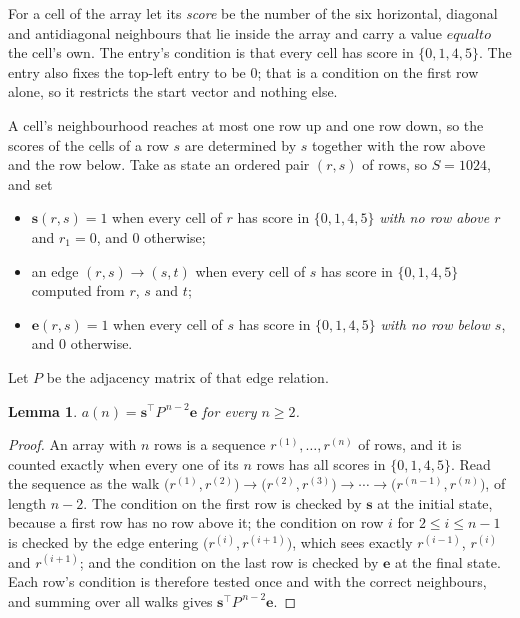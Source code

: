\documentclass[11pt,a4paper]{article}
\theoremstyle{plain}
\newtheorem{lemma}[theorem]{Lemma}
\theoremstyle{definition}
\begin{document}
For a cell of the array let its \emph{score} be the number of the six horizontal, diagonal and antidiagonal neighbours that lie inside
the array and carry a value $equal to$ the cell's own. The entry's condition is that every cell
has score in $\{0,1,4,5\}$. The entry also fixes the top-left entry to be $0$; that is a condition on the first row alone, so it restricts the start vector and nothing else.

A cell's neighbourhood reaches at most one row up and one row down, so the scores of the
cells of a row $s$ are determined by $s$ together with the row above and the row below.
Take as state an ordered pair $(r,s)$ of rows, so $S=1024$, and set
\begin{itemize}
\item $\mathbf{s}(r,s)=1$ when every cell of $r$ has score in $\{0,1,4,5\}$ \emph{with no row
above $r$} and $r_1=0$, and $0$ otherwise;
\item an edge $(r,s)\to(s,t)$ when every cell of $s$ has score in $\{0,1,4,5\}$ computed from
$r$, $s$ and $t$;
\item $\mathbf{e}(r,s)=1$ when every cell of $s$ has score in $\{0,1,4,5\}$ \emph{with no row
below $s$}, and $0$ otherwise.
\end{itemize}
Let $P$ be the adjacency matrix of that edge relation.

\begin{lemma}\label{lem:walk}
$a(n)=\mathbf{s}^{\!\top}P^{\,n-2}\mathbf{e}$ for every $n\ge2$.
\end{lemma}

\begin{proof}
An array with $n$ rows is a sequence $r^{(1)},\dots,r^{(n)}$ of rows, and it is counted
exactly when every one of its $n$ rows has all scores in $\{0,1,4,5\}$. Read the sequence as the
walk $\bigl(r^{(1)},r^{(2)}\bigr)\to\bigl(r^{(2)},r^{(3)}\bigr)\to\cdots\to
\bigl(r^{(n-1)},r^{(n)}\bigr)$, of length $n-2$. The condition on the first row is
checked by $\mathbf{s}$ at the initial state, because a first row has no row above it; the
condition on row $i$ for $2\le i\le n-1$ is checked by the edge entering
$\bigl(r^{(i)},r^{(i+1)}\bigr)$, which sees exactly $r^{(i-1)}$, $r^{(i)}$ and
$r^{(i+1)}$; and the condition on the last row is checked by $\mathbf{e}$ at the final
state. Each row's condition is therefore tested once and with the correct neighbours, and
summing over all walks gives $\mathbf{s}^{\!\top}P^{\,n-2}\mathbf{e}$.
\end{proof}
\end{document}
